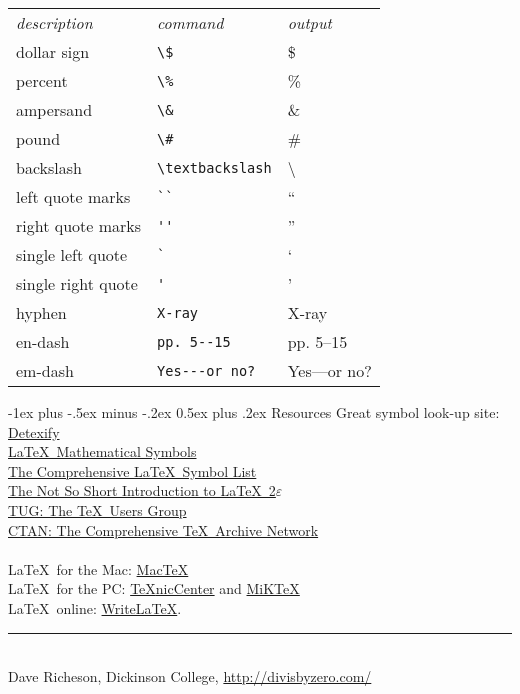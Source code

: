 \documentclass[10pt,landscape]{article}
\makeatletter
\renewcommand{\section}{\@startsection{section}{1}{0mm}%
                                {-1ex plus -.5ex minus -.2ex}%
                                {0.5ex plus .2ex}%
                                {\normalfont\large\bfseries}}
\makeatother
\begin{document}
\begin{multicols}{3}
    \begin{tabular}{lll}
        \emph{description} & \emph{command}        & \emph{output}  \\
        dollar sign        & \verb!\$!             & \$             \\
        percent            & \verb!\%!             & \%             \\
        ampersand          & \verb!\&!             & \&             \\
        pound              & \verb!\#!             & \#             \\
        backslash          & \verb!\textbackslash! & \textbackslash \\
        left quote marks   & \verb!``!             & ``             \\
        right quote marks  & \verb!''!             & ''             \\
        single left quote  & \verb!`!              & `              \\
        single right quote & \verb!'!              & '              \\
        hyphen             & \verb!X-ray!          & X-ray          \\
        en-dash            & \verb!pp. 5--15!      & pp. 5--15      \\
        em-dash            & \verb!Yes---or no?!   & Yes---or no?
    \end{tabular}

    \section{Resources}
    Great symbol look-up site: \href{http://detexify.kirelabs.org/}{Detexify}\\
    \href{http://amath.colorado.edu/documentation/LaTeX/Symbols.pdf}{\LaTeX\ Mathematical Symbols}\\
    \href{ftp://tug.ctan.org/pub/tex-archive/info/symbols/comprehensive/symbols-letter.pdf}{The Comprehensive \LaTeX\ Symbol List}\\
    \href{http://mirrors.med.harvard.edu/ctan/info/lshort/english/lshort.pdf}{The Not So Short Introduction to \LaTeX\ 2$\varepsilon$}\\
    \href{http://www.tug.org/}{TUG: The \TeX\ Users Group}\\
    \href{http://www.ctan.org/}{CTAN: The Comprehensive \TeX\ Archive Network}\\
    ~\\
    \LaTeX\ for the Mac: \href{http://www.tug.org/mactex/}{Mac\TeX}\\
    \LaTeX\ for the PC: \href{http://www.texniccenter.org/}{{\TeX}nicCenter} and \href{http://miktex.org/}{MiK\TeX}\\
    \LaTeX\ online: \href{http://www.writelatex.com/}{WriteLaTeX}.
    \vfill
    \hrule
    ~\\
    Dave Richeson, Dickinson College, \href{http://divisbyzero.com/}{http://divisbyzero.com/}
\end{multicols}
\end{document}
